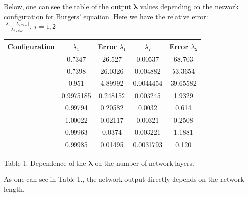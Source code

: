 \documentclass{beamer}
\renewcommand{\vec}[1]{\boldsymbol{#1}}
\begin{document}
\begin{frame}

Below, one can see the table of the output $\vec{\lambda}$ values depending on the network configuration for Burgers' equation. 
Here we have the relative error: $\frac{\vert \lambda_i - \lambda_{i~True}\vert}{\lambda_{i~True}},~ i =1, 2$
\begin{center}
\begin{tabular}{||c | c | c | c | c||} 
\hline
Configuration & $\lambda_1$ & Error $\lambda_1$ & $\lambda_2$ & Error $\lambda_2$ \\ 
\hline\hline
[2, 10, 1] & 0.7347 & 26.527 & 0.00537 & 68.703 \\
\hline
[2, 20, 1] & 0.7398 & 26.0326 & 0.004882 & 53.3654 \\
\hline
[2, 10, 20, 1] & 0.951 &  4.89992 & 0.0044454 & 39.65582 \\
\hline
[2, 10, 20x2, 1] & 0.9975185 & 0.248152 & 0.003245 & 1.9329 \\
\hline
[2, 10, 20x3, 1] & 0.99794 &  0.20582 & 0.0032 & 0.614 \\
\hline
[2, 10, 20x4, 1] & 1.00022 & 0.02117 & 0.00321 & 0.2508 \\
\hline
[2, 10, 20x5, 1] & 0.99963 & 0.0374 & 0.003221 & 1.1881 \\
\hline
[2, 10, 20x6, 1] & 0.99985 & 0.01495 & 0.0031793 & 0.120 \\
\hline
\end{tabular}

\caption{Table 1. Dependence of the $\vec{\lambda}$ on the number of network layers.}

\end{center}
    
\end{frame}

\begin{frame}

As one can see in Table 1., the network output directly depends on the network length. 
    
\end{frame}





\end{document}
